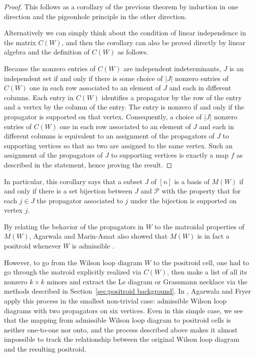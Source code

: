 \documentclass[11pt]{article}
\newcommand{\cP}{\mathcal{P}}
\theoremstyle{remark}
\theoremstyle{definition}
\begin{document}
\begin{proof}
  This follows as a corollary of the previous theorem by induction in one direction and the pigeonhole principle in the other direction.  

  Alternatively we can simply think about the condition of linear independence in the matrix $C(W)$, and then the corollary can also be proved directly by linear algebra and the definition of $C(W)$ as follows.

  Because the nonzero entries of $C(W)$ are independent indeterminants, $J$ is an independent set if and only if there is some choice of $|J|$ nonzero entries of $C(W)$ one in each row associated to an element of $J$ and each in different columns. Each entry in $C(W)$ identifies a propagator by the row of the entry and a vertex by the column of the entry.  The entry is nonzero if and only if the propagator is supported on that vertex.  Consequently, a choice of $|J|$ nonzero entries of $C(W)$ one in each row associated to an element of $J$ and each in different columns is equivalent to an assignment of the propagators of $J$ to supporting vertices so that no two are assigned to the same vertex.  Such an assignment of the propagators of $J$ to supporting vertices is exactly a map $f$ as described in the statement, hence proving the result.
\end{proof}

In particular, this corollary says that a subset $J$ of $[n]$ is a basis of $M(W)$ if and only if there is a set bijection between $J$ and $\cP$ with the property that for each $j\in J$ the propagator associated to $j$ under the bijection is supported on vertex $j$.


By relating the behavior of the propagators in $W$ to the matroidal properties of $M(W)$, Agarwala and Marin-Amat also showed that $M(W)$ is in fact a positroid whenever $W$ is admissible \cite[Corollary 3.39]{wilsonloop}.

However, to go from the Wilson loop diagram $W$ to the positroid cell, one had to go through the matroid explicitly realized via $C(W)$, then make a list of all its nonzero $k\times k$ minors and extract the Le diagram or Grassmann necklace via the methods described in Section~\ref{sec:positroid background}. In \cite{casestudy}, Agarwala and Fryer apply this process in the smallest non-trivial case: admissible Wilson loop diagrams with two propagators on six vertices. Even in this simple case, we see that the mapping from admissible Wilson loop diagram to positroid cells is neither one-to-one nor onto, and the process described above makes it almost impossible to track the relationship between the original Wilson loop diagram and the resulting positroid.
\end{document}
